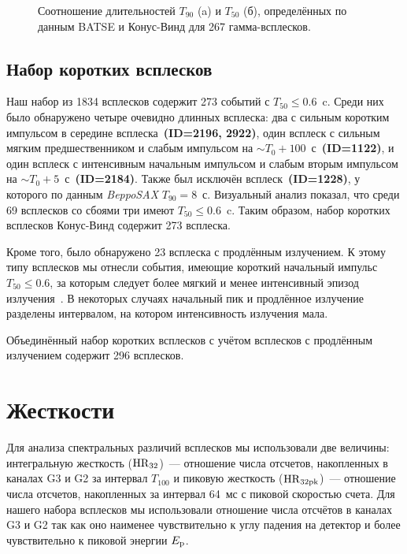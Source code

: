 \begin{figure}[h]
  \begin{minipage}[h]{0.5\textwidth}
  \end{minipage}
  \hfill
  \begin{minipage}[h]{0.5\textwidth}
  \end{minipage}
  \caption{Соотношение длительностей $T_{90}$ (a) и $T_{50}$ (б), определённых по 
  данным BATSE и Конус-Винд для 267 гамма-всплесков.}
  \label{img:T90andT50_KWvsBATSE}  
\end{figure}

\subsection{Набор коротких всплесков}
Наш набор из 1834 всплесков содержит 273 событий с $T_{50} \leq 0.6$~c. 
Среди них было обнаружено четыре очевидно длинных всплеска: два с сильным коротким 
импульсом в середине всплеска~\textbf{(ID=2196, 2922)}, один всплеск с сильным мягким 
предшественником и слабым импульсом на $\sim T_0+100$~с~\textbf{(ID=1122)}, 
и один всплеск с интенсивным начальным импульсом и слабым вторым импульсом на 
$\sim T_0+5$~с~\textbf{(ID=2184)}. Также был исключён всплеск~\textbf{(ID=1228)}, 
у которого по данным \textit{BeppoSAX} $T_{90} = 8$~с. Визуальный анализ показал, 
что среди 69 всплесков со сбоями три имеют $T_{50} \leq 0.6$~c. Таким образом, 
набор коротких всплесков Конус-Винд содержит 273 всплеска.

Кроме того, было обнаружено 23 всплеска с продлённым излучением. К этому типу 
всплесков мы отнесли события, имеющие короткий начальный импульс $T_{50} \leq 0.6$, 
за которым следует более мягкий и менее интенсивный эпизод 
излучения~\citep{Frederiks_2004ASPC, Norris_2011ApJ, Norris_and_Bonnel_2006}. 
В некоторых случаях начальный пик и продлённое излучение разделены интервалом, 
на котором интенсивность излучения мала.

Объединённый набор коротких всплесков с учётом всплесков с продлённым излучением 
содержит 296 всплесков.

\clearpage

\section{Жесткости}\label{sec:Hardness}
Для анализа спектральных различий всплесков мы использовали две величины: интегральную 
жесткость (${\mathrm{HR}}_{32}$)~--- отношение числа отсчетов, накопленных в каналах G3 и G2 
за интервал $T_{100}$ и пиковую жесткость (${\mathrm{HR}}_{32{\mathrm{pk}}}$)~--- отношение числа отсчетов, 
накопленных за интервал 64~мс с пиковой скоростью счета. Для нашего набора 
всплесков мы использовали отношение числа отсчётов в каналах G3 и G2 так как 
оно наименее чувствительно к углу падения на детектор и более чувствительно 
к пиковой энергии $E_{{\mathrm{p}}}$.  

